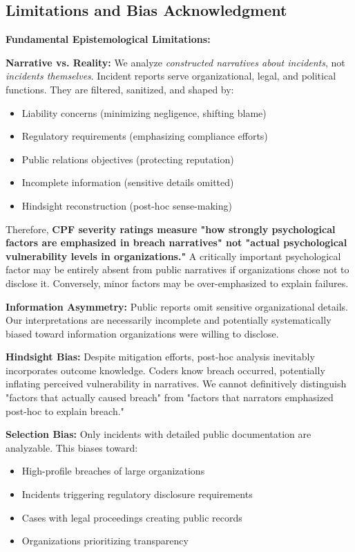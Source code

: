 \documentclass[11pt,a4paper]{article}
\begin{document}
\subsection{Limitations and Bias Acknowledgment}

\textbf{Fundamental Epistemological Limitations:}

\textbf{Narrative vs. Reality:} We analyze \textit{constructed narratives about incidents}, not \textit{incidents themselves}. Incident reports serve organizational, legal, and political functions. They are filtered, sanitized, and shaped by:
\begin{itemize}
\item Liability concerns (minimizing negligence, shifting blame)
\item Regulatory requirements (emphasizing compliance efforts)
\item Public relations objectives (protecting reputation)
\item Incomplete information (sensitive details omitted)
\item Hindsight reconstruction (post-hoc sense-making)
\end{itemize}

Therefore, \textbf{CPF severity ratings measure "how strongly psychological factors are emphasized in breach narratives" not "actual psychological vulnerability levels in organizations."} A critically important psychological factor may be entirely absent from public narratives if organizations chose not to disclose it. Conversely, minor factors may be over-emphasized to explain failures.

\textbf{Information Asymmetry:} Public reports omit sensitive organizational details. Our interpretations are necessarily incomplete and potentially systematically biased toward information organizations were willing to disclose.

\textbf{Hindsight Bias:} Despite mitigation efforts, post-hoc analysis inevitably incorporates outcome knowledge. Coders know breach occurred, potentially inflating perceived vulnerability in narratives. We cannot definitively distinguish "factors that actually caused breach" from "factors that narrators emphasized post-hoc to explain breach."

\textbf{Selection Bias:} Only incidents with detailed public documentation are analyzable. This biases toward:
\begin{itemize}
\item High-profile breaches of large organizations
\item Incidents triggering regulatory disclosure requirements
\item Cases with legal proceedings creating public records
\item Organizations prioritizing transparency
\end{itemize}
\end{document}
